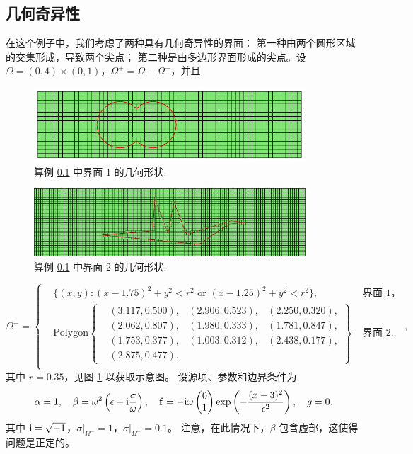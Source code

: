 \subsection{几何奇异性}
\label{subsec:geo_sing}
在这个例子中，我们考虑了两种具有几何奇异性的界面：
第一种由两个圆形区域的交集形成，导致两个尖点；
第二种是由多边形界面形成的尖点。设
$\Omega=(0, 4)\times(0, 1)$，$\Omega^+ = \Omega - \Omega^-$，并且
\begin{figure}[h]
\centering
\includegraphics[width=4in]{./figures/maxwell/mesh_double_circle.pdf}
\caption{ 算例 \ref{subsec:geo_sing} 中界面 1 的几何形状.}
\label{fig:interfacedoublecircle}
\end{figure}
\begin{figure}[h]
\centering
\includegraphics[width=4in]{./figures/maxwell/poly_interface.pdf}
\caption{算例 \ref{subsec:geo_sing} 中界面 2 的几何形状.}
\label{fig:interfacepoly}
\end{figure}
$$
\Omega^- = \left\{
\begin{aligned}
&\{(x, y) : (x-1.75)^2 + y^2 < r^2  \text{ or }
(x-1.25)^2 + y^2 < r^2  \},\quad
& \text{ 界面 1，}\\
&\mathrm{Polygon}
\left\{
\begin{matrix}
& (3.117, 0.500),
& (2.906, 0.523),
& (2.250, 0.320),\\
& (2.062, 0.807),
& (1.980, 0.333),
& (1.781, 0.847),\\
& (1.753, 0.377),
& (1.003, 0.312),
& (2.438, 0.177),\\
& (2.875, 0.477).
& &
\end{matrix}
\right\}
& \text{ 界面 2.}\\
\end{aligned}
\right.,
$$
其中 $r = 0.35$，见图 \ref{fig:interfacedoublecircle} 以获取示意图。
设源项、参数和边界条件为
$$
\alpha = 1, \quad \beta = \omega^2 \left( \epsilon + {\rm i} \frac{\sigma}{\omega} \right), \quad {\bf f} = -{\rm i}\omega \begin{pmatrix}
0\\
1
\end{pmatrix} \exp\left(-\frac{(x-3)^2}{\epsilon^2}\right), \quad g = 0.
$$
其中 ${\rm i} = \sqrt{-1}$，$\sigma|_{\Omega^-} = 1$，$\sigma|_{\Omega^+} = 0.1$。
注意，在此情况下，$\beta$ 包含虚部，这使得问题是正定的。

